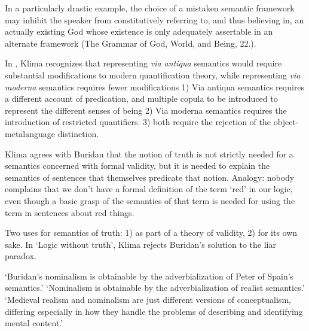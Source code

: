 \documentclass[]{article}
\begin{document}
In a particularly drastic example, the choice of a mistaken semantic framework may inhibit the speaker from constitutively referring to, and thus believing in, an actually existing God whose existence is only adequately assertable in an alternate framework (The Grammar of God, World, and Being, 22.).

In \autocite{Klima2008a}, Klima recognizes that representing \emph{via antiqua} semantics would require substantial modifications to modern quantification theory, while representing \emph{via moderna} semantics requires fewer modifications
1) Via antiqua semantics requires a different account of predication, and multiple copula to be introduced to represent the different senses of being
2) Via moderna semantics requires the introduction of restricted quantifiers.
3) both require the rejection of the object-metalanguage distinction.


Klima agrees with Buridan that the notion of truth is not strictly needed for a semantics concerned with formal validity, but it is needed to explain the semantics of sentences that themselves predicate that notion.
Analogy: nobody complains that we don't have a formal definition of the term `red' in our logic, even though a basic grasp of the semantics of that term is needed for using the term in sentences about red things.

Two uses for semantics of truth: 1) as part of a theory of validity, 2) for its own sake.
In `Logic without truth', Klima rejects Buridan's solution to the liar paradox.

`Buridan’s nominalism is obtainable by the adverbialization of Peter
of Spain’s semantics.'
`Nominalism is obtainable by the adverbialization of realist
semantics.'
`Medieval realism and nominalism are just different versions of conceptualism, differing especially in how they handle the problems of
describing and identifying mental content.'\autocite[110]{Klima2011}
\end{document}

